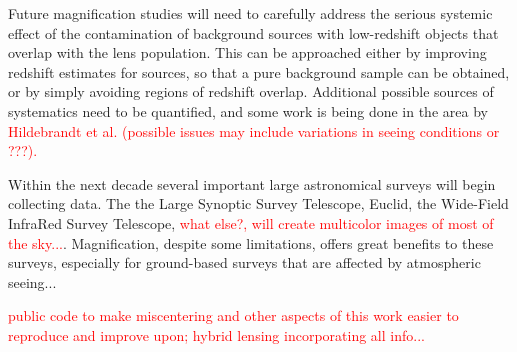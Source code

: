 Future magnification studies will need to carefully address the serious systemic effect of the contamination of background sources with low-redshift objects that overlap with the lens population. This can be approached either by improving redshift estimates for sources, so that a pure background sample can be obtained, or by simply avoiding regions of redshift overlap. Additional possible sources of systematics need to be quantified, and some work is being done in the area by \textcolor{red}{Hildebrandt et al. (possible issues may include variations in seeing conditions or ???).}

Within the next decade several important large astronomical surveys will begin collecting data. The the Large Synoptic Survey Telescope, Euclid, the Wide-Field InfraRed Survey Telescope, \textcolor{red}{what else?, will create multicolor images of most of the sky...}. Magnification, despite some limitations, offers great benefits to these surveys, especially for ground-based surveys that are affected by atmospheric seeing...

\textcolor{red}{public code to make miscentering and other aspects of this work easier to reproduce and improve upon; hybrid lensing incorporating all info...}

\endinput
Any text after an \endinput is ignored.
You could put scraps here or things in progress.
